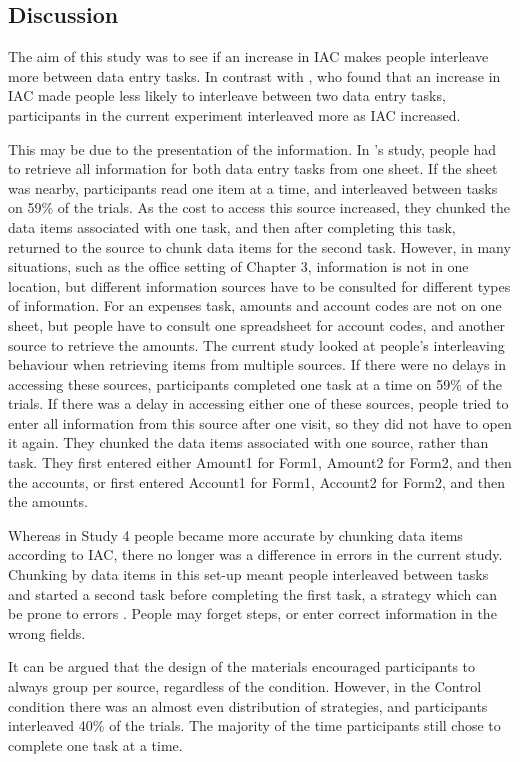 \subsection{Discussion}
The aim of this study was to see if an increase in IAC makes people interleave more between data entry tasks. In contrast with \citet{Back2012}, who found that an increase in IAC made people less likely to interleave between two data entry tasks, participants in the current experiment interleaved more as IAC increased.

This may be due to the presentation of the information. In \citet{Back2012}'s study, people had to retrieve all information for both data entry tasks from one sheet. If the sheet was nearby, participants read one item at a time, and interleaved between tasks on 59\% of the trials.  As the cost to access this source increased, they chunked the data items associated with one task, and then after completing this task, returned to the source to chunk data items for the second task.
However, in many situations, such as the office setting of Chapter 3, information is not in one location, but different information sources have to be consulted for different types of information. For an expenses task, amounts and account codes are not on one sheet, but people have to consult one spreadsheet for account codes, and another source to retrieve the amounts. The current study looked at people's interleaving behaviour when retrieving items from multiple sources. If there were no delays in accessing these sources, participants completed one task at a time on 59\% of the trials. If there was a delay in accessing either one of these sources, people tried to enter all information from this source after one visit, so they did not have to open it again. They chunked the data items associated with one source, rather than task. They first entered either Amount1 for Form1, Amount2 for Form2, and then the accounts, or first entered Account1 for Form1, Account2 for Form2, and then the amounts.

Whereas in Study 4 people became more accurate by chunking data items according to IAC, there no longer was a difference in errors in the current study. Chunking by data items in this set-up meant people interleaved between tasks and started a second task before completing the first task, a strategy which can be prone to errors \citep{}. People may forget steps, or enter correct information in the wrong fields.

It can be argued that the design of the materials encouraged participants to always group per source, regardless of the condition. However, in the Control condition there was an almost even distribution of strategies, and participants interleaved 40\% of the trials. The majority of the time participants still chose to complete one task at a time.

